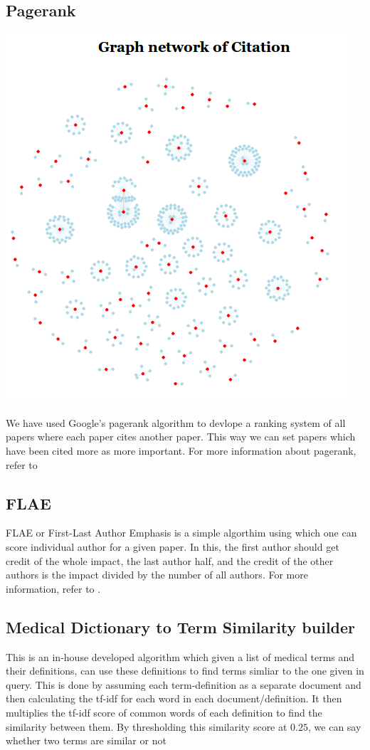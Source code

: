 \documentclass[paper=a4, fontsize=11pt]{scrartcl}
\numberwithin{equation}{section}		%
\numberwithin{figure}{section}			%
\numberwithin{table}{section}				%
\begin{document}
\subsection{Pagerank}
\begin{center}
\includegraphics[scale=0.55]{citation_graph} \\
\end{center}

We have used Google's pagerank algorithm to devlope a ranking system of all papers where each paper cites another paper. This way we can set papers which have been cited more as more important. For more information about pagerank, refer to \cite{prank}

\subsection{FLAE}
FLAE or First-Last Author Emphasis is a simple algorthim using which one can score individual author for a given paper. In this, the first author should get credit of the whole impact, the last author half, and the credit of the other authors is the impact divided by the number of all authors. For more information, refer to \cite{flae}.

\subsection{Medical Dictionary to Term Similarity builder}
This is an in-house developed algorithm which given a list of medical terms and their definitions, can use these definitions to find terms simliar to the one given in query. This is done by assuming each term-definition as a separate document and then calculating the tf-idf for each word in each document/definition. It then multiplies the tf-idf score of common words of each definition to find the similarity between them. By thresholding this similarity score at $0.25$, we can say whether two terms are similar or not
\end{document}
